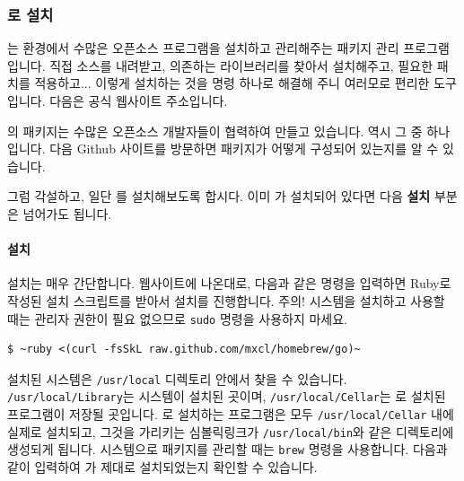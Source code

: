 \subsubsection{\BREW{}로 설치}

\BREW{}는 \MAC{} 환경에서 수많은 오픈소스 프로그램을 설치하고 관리해주는 패키지
관리 프로그램입니다. 직접 소스를 내려받고, 의존하는 라이브러리를
찾아서 설치해주고, 필요한 패치를 적용하고... 이렇게 설치하는 것을 명령 하나로
해결해 주니 여러모로 편리한 도구입니다. 다음은 공식 웹사이트 주소입니다.

\begin{center}
\end{center}

\BREW{}의 패키지는 수많은 오픈소스 개발자들이 협력하여 만들고
있습니다. \OCAML{} 역시 그 중 하나입니다. 다음 \textsf{Github} 사이트를
방문하면 \OCAML{} 패키지가 어떻게 구성되어 있는지를 알 수 있습니다.

\begin{center}
\end{center}


그럼 각설하고, 일단 \BREW{}를 설치해보도록 합시다. 이미 \BREW{}가 설치되어
있다면 다음 \textbf{\BREW{} 설치} 부분은 넘어가도 됩니다.

\paragraph{\BREW{} 설치} \BREW{} 설치는 매우 간단합니다. 웹사이트에 나온대로,
다음과 같은 명령을 입력하면 \textsf{Ruby}로 작성된 설치 스크립트를 받아서
설치를 진행합니다. 주의! \BREW{} 시스템을 설치하고 사용할 때는 관리자 권한이
필요 없으므로 \texttt{sudo} 명령을 사용하지 마세요.

\begin{lstlisting}
$ ~ruby <(curl -fsSkL raw.github.com/mxcl/homebrew/go)~
\end{lstlisting}

설치된 \BREW{} 시스템은 \texttt{/usr/local} 디렉토리 안에서 찾을 수 있습니다.
\texttt{/usr/local/Library}는 \BREW{} 시스템이 설치된 곳이며,
\texttt{/usr/local/Cellar}는 \BREW{}로 설치된 프로그램이 저장될 곳입니다.
\BREW{}로 설치하는 프로그램은 모두 \texttt{/usr/local/Cellar} 내에 실제로
설치되고, 그것을 가리키는 심볼릭링크가 \texttt{/usr/local/bin}와 같은
디렉토리에 생성되게 됩니다. \BREW{} 시스템으로 패키지를 관리할 때는
\texttt{brew} 명령을 사용합니다. 다음과 같이 입력하여 \BREW{}가 제대로
설치되었는지 확인할 수 있습니다.


